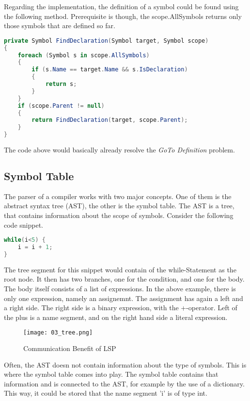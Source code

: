 Regarding the implementation, the definition of a symbol could be found using the following method. Prerequisite is though, the scope.AllSymbols returns only those symbols that are defined so far.


\begin{lstlisting}[language=csharp, caption={Finding Symbol Definition}, captionpos=b, label={lst:findsymbol}]
private Symbol FindDeclaration(Symbol target, Symbol scope)
{
    foreach (Symbol s in scope.AllSymbols)
    {
        if (s.Name == target.Name && s.IsDeclaration)
        {
            return s;
        }
    }
    if (scope.Parent != null)
    {
        return FindDeclaration(target, scope.Parent);
    }
}
\end{lstlisting}

The code above would basically already resolve the \textit{GoTo Definition} problem.

\subsection{Symbol Table}
The parser of a compiler works with two major concepts. One of them is the abstract syntax tree (AST), the other is the symbol table. The AST is a tree, that contains information about the scope of symbols. Consider the following code snippet.

\begin{lstlisting}[language=csharp, caption={AST Demo Snippet}, captionpos=b, label={lst:astsnipped}]
while(i<5) {
    i = i + 1;
}
\end{lstlisting}

The tree segment for this snippet would contain of the while-Statement as the root node. It then has two branches, one for the condition, and one for the body. The body itself consists of a list of expressions. In the above example, there is only one expression, namely an assignemnt. The assignment has again a left and a right side. The right side is a binary expression, with the +-operator. Left of the plus is a name segment, and on the right hand side a literal expression.\\

\begin{figure}[h]
    \centering
    \texttt{[image: 03\_tree.png]}
    \caption{Communication Benefit of LSP}
    \label{fig:lspcommunication}
\end{figure}

Often, the AST doesn not contain information about the type of symbols. This is where the symbol table comes into play. The symbol table contains that information and is connected to the AST, for example by the use of a dictionary. This way, it could be stored that the name segment 'i' is of type int.

